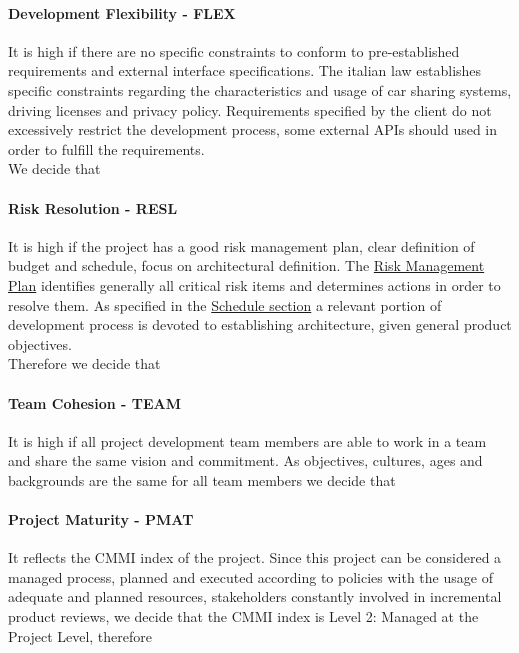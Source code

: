 \paragraph{Development Flexibility - FLEX} It is high if there are no specific constraints to conform to pre-established requirements and external interface specifications. The italian law establishes specific constraints regarding the characteristics and usage of car sharing systems, driving licenses and privacy policy. Requirements specified by the client do not excessively restrict the development process, some external APIs should used in order to fulfill the requirements.\\We decide that

\paragraph{Risk Resolution - RESL} It is high if the project has a good risk management plan, clear definition of budget and schedule, focus on architectural definition. The \hyperref[sec:riskManagement]{Risk Management Plan} identifies generally all critical risk items and determines actions in order to resolve them. As specified in the \hyperref[sec:schedule]{Schedule section} a relevant portion of development process is devoted to establishing architecture, given general product objectives.\\Therefore we decide that

\paragraph{Team Cohesion - TEAM} It is high if all project development team members are able to work in a team and share the same vision and commitment. As objectives, cultures, ages and backgrounds are the same for all team members we decide that

\paragraph{Project Maturity - PMAT} It reflects the CMMI index of the project. Since this project can be considered a managed process, planned and executed according to policies with the usage of adequate and planned resources, stakeholders constantly involved in incremental product reviews, we decide that the CMMI index is Level 2: Managed at the Project Level, therefore

